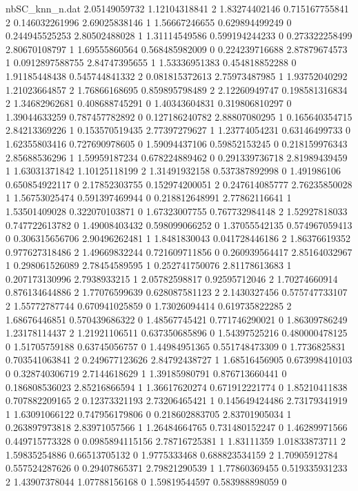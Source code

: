 \begin{filecontents}{nbSC_knn_n.dat}
2.05149059732 1.12104318841 2
1.83274402146 0.715167755841 2
0.146032261996 2.69025838146 1
1.56667246655 0.629894499249 0
0.244945525253 2.80502488028 1
1.31114549586 0.599194244233 0
0.273322258499 2.80670108797 1
1.69555860564 0.568485982009 0
0.224239716688 2.87879674573 1
0.0912897588755 2.84747395655 1
1.53336951383 0.454818852288 0
1.91185448438 0.545744841332 2
0.081815372613 2.75973487985 1
1.93752040292 1.21023664857 2
1.76866168695 0.859895798489 2
2.12260949747 0.198581316834 2
1.34682962681 0.408688745291 0
1.40343604831 0.319806810297 0
1.39044633259 0.787457782892 0
0.127186240782 2.88807080295 1
0.165640354715 2.84213369226 1
0.153570519435 2.77397279627 1
1.23774054231 0.63146499733 0
1.62355803416 0.727690978605 0
1.59094437106 0.59852153245 0
0.218159976343 2.85688536296 1
1.59959187234 0.678224889462 0
0.291339736718 2.81989439459 1
1.63031371842 1.10125118199 2
1.31491932158 0.537387892998 0
1.491986106 0.650854922117 0
2.17852303755 0.152974200051 2
0.247614085777 2.76235850028 1
1.56753025474 0.591397469944 0
0.218812648991 2.77862116641 1
1.53501409028 0.322070103871 0
1.67323007755 0.767732984148 2
1.52927818033 0.747722613782 0
1.49008403432 0.598099066252 0
1.37055542135 0.574967059413 0
0.306315656706 2.90496262481 1
1.8481830043 0.041728446186 2
1.86376619352 0.977627318486 2
1.49669832244 0.721609711856 0
0.260939564417 2.85164032967 1
0.298061526089 2.78454589595 1
0.252741750076 2.81178613683 1
0.207173130996 2.7938933215 1
2.05782598817 0.92595712046 2
1.70274660914 0.876134644886 2
1.77076599639 0.628087581123 2
2.1430327456 0.575747733107 2
1.55772787744 0.670941025859 0
1.73026094414 0.619735822285 2
1.68676446851 0.570439686322 0
1.48567745421 0.771746290021 0
1.86309786249 1.23178114437 2
1.21921106511 0.637350685896 0
1.54397525216 0.480000478125 0
1.51705759188 0.63745056757 0
1.44984951365 0.551748473309 0
1.7736825831 0.703541063841 2
0.249677123626 2.84792438727 1
1.68516456905 0.673998410103 0
0.328740306719 2.7144618629 1
1.39185980791 0.876713660441 0
0.186808536023 2.85216866594 1
1.36617620274 0.671912221774 0
1.85210411838 0.707882209165 2
0.12373321193 2.73206465421 1
0.145649424486 2.73179341919 1
1.63091066122 0.747956179806 0
0.218602883705 2.83701905034 1
0.263897973818 2.83971057566 1
1.26484664765 0.731480152247 0
1.46289971566 0.449715773328 0
0.0985894115156 2.78716725381 1
1.83111359 1.01833873711 2
1.59835254886 0.66513705132 0
1.9775333468 0.688823534159 2
1.70905912784 0.557524287626 0
0.29407865371 2.79821290539 1
1.77860369455 0.519335931233 2
1.43907378044 1.07788156168 0
1.59819544597 0.583988898059 0

\end{filecontents}
